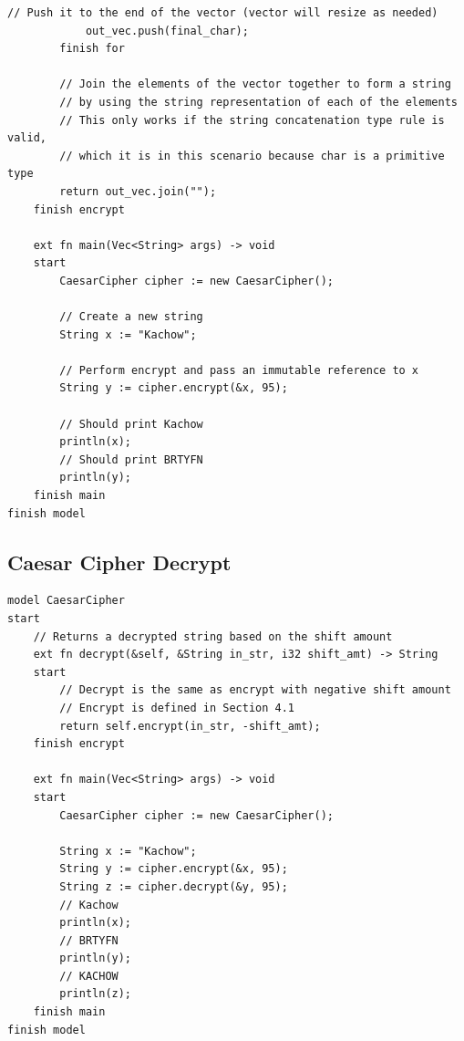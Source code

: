 \documentclass[letterpaper, 10pt, DIV=13]{scrartcl}
\numberwithin{equation}{section}
\numberwithin{figure}{section}
\numberwithin{table}{section}
\begin{document}
\begin{lstlisting}[caption = CaesarCipher.rez, frame = single, nolol]
            // Push it to the end of the vector (vector will resize as needed)
            out_vec.push(final_char);
        finish for

        // Join the elements of the vector together to form a string
        // by using the string representation of each of the elements
        // This only works if the string concatenation type rule is valid,
        // which it is in this scenario because char is a primitive type
        return out_vec.join("");
    finish encrypt

    ext fn main(Vec<String> args) -> void
    start
        CaesarCipher cipher := new CaesarCipher();

        // Create a new string
        String x := "Kachow";
        
        // Perform encrypt and pass an immutable reference to x
        String y := cipher.encrypt(&x, 95);

        // Should print Kachow
        println(x);
        // Should print BRTYFN
        println(y);
    finish main
finish model
\end{lstlisting}
\subsection{Caesar Cipher Decrypt}
\begin{lstlisting}[caption = CaesarCipher.rez (enhanced), frame = single, nolol]
model CaesarCipher
start
    // Returns a decrypted string based on the shift amount
    ext fn decrypt(&self, &String in_str, i32 shift_amt) -> String
    start
        // Decrypt is the same as encrypt with negative shift amount
        // Encrypt is defined in Section 4.1
        return self.encrypt(in_str, -shift_amt);
    finish encrypt

    ext fn main(Vec<String> args) -> void
    start
        CaesarCipher cipher := new CaesarCipher();

        String x := "Kachow";
        String y := cipher.encrypt(&x, 95);
        String z := cipher.decrypt(&y, 95);
        // Kachow
        println(x);
        // BRTYFN
        println(y);
        // KACHOW
        println(z);
    finish main
finish model
\end{lstlisting}
\end{document}

